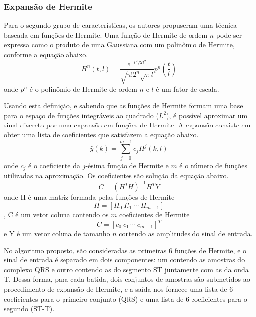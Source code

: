 \subsubsection{Expansão de Hermite}
Para o segundo grupo de características, os autores propuseram uma técnica baseada em funções de Hermite. Uma função de Hermite de ordem $n$ pode ser expressa como o produto de uma Gaussiana com um polinômio de Hermite, conforme a equação abaixo.
\begin{equation} \label{equ:hermite_function}
    H^n(t,l) = \frac{e^{-t^2/2l^2}}{\sqrt{n!2^n\sqrt{\pi}l}}p^n\left(\frac{t}{l}\right)
\end{equation}
onde $p^n$ é o polinômio de Hermite de ordem $n$ e $l$ é um fator de escala.

Usando esta definição, e sabendo que as funções de Hermite formam uma base para o espaço de funções integráveis ao quadrado ($L^2$), é possível aproximar um sinal discreto por uma expansão em funções de Hermite. A expansão consiste em obter uma lista de coeficientes que satisfazem a equação abaixo.
\begin{equation} \label{equ:hermite_expansion}
   \hat{y}(k) = \sum_{j=0}^{m-1} c_jH^j(k,l)
\end{equation}
onde $c_j$ é o coeficiente da $j$-ésima função de Hermite e $m$ é o número de funções utilizadas na aproximação. Os coeficientes são solução da equação abaixo.
\begin{equation} \label{equ:solve}
    C = (H^TH)^{-1}H^TY
\end{equation}
onde H é uma matriz formada pelas funções de Hermite
\begin{equation}
    H = [H_0\ H_1\ \cdots\ H_{m-1}]
\end{equation},
C é um vetor coluna contendo os $m$ coeficientes de Hermite
\begin{equation}
    C = [c_0\ c_1\ \cdots\ c_{m-1}]^T
\end{equation}
e Y é um vetor coluna de tamanho $n$ contendo as amplitudes do sinal de entrada.

No algoritmo proposto, são consideradas as primeiras 6 funções de Hermite, e o sinal de entrada é separado em dois componentes: um contendo as amostras do complexo QRS e outro contendo as do segmento ST juntamente com as da onda T. Dessa forma, para cada batida, dois conjuntos de amostras são submetidos ao procedimento de expansão de Hermite, e a saída nos fornece uma lista de 6 coeficientes para o primeiro conjunto (QRS) e uma lista de 6 coeficientes para o segundo (ST-T).

